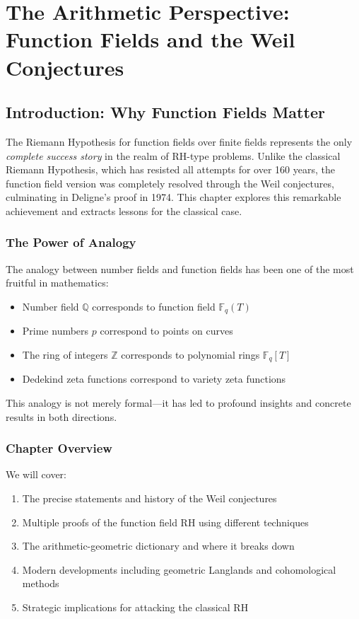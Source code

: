 \chapter{The Arithmetic Perspective: Function Fields and the Weil Conjectures}
\label{ch:function_fields}

\section{Introduction: Why Function Fields Matter}

The Riemann Hypothesis for function fields over finite fields represents the only \emph{complete success story} in the realm of RH-type problems. Unlike the classical Riemann Hypothesis, which has resisted all attempts for over 160 years, the function field version was completely resolved through the Weil conjectures, culminating in Deligne's proof in 1974. This chapter explores this remarkable achievement and extracts lessons for the classical case.

\subsection{The Power of Analogy}

The analogy between number fields and function fields has been one of the most fruitful in mathematics:
\begin{itemize}
\item Number field $\mathbb{Q}$ corresponds to function field $\mathbb{F}_q(T)$
\item Prime numbers $p$ correspond to points on curves
\item The ring of integers $\mathbb{Z}$ corresponds to polynomial rings $\mathbb{F}_q[T]$
\item Dedekind zeta functions correspond to variety zeta functions
\end{itemize}

This analogy is not merely formal—it has led to profound insights and concrete results in both directions.

\subsection{Chapter Overview}

We will cover:
\begin{enumerate}
\item The precise statements and history of the Weil conjectures
\item Multiple proofs of the function field RH using different techniques
\item The arithmetic-geometric dictionary and where it breaks down
\item Modern developments including geometric Langlands and cohomological methods
\item Strategic implications for attacking the classical RH
\end{enumerate}


